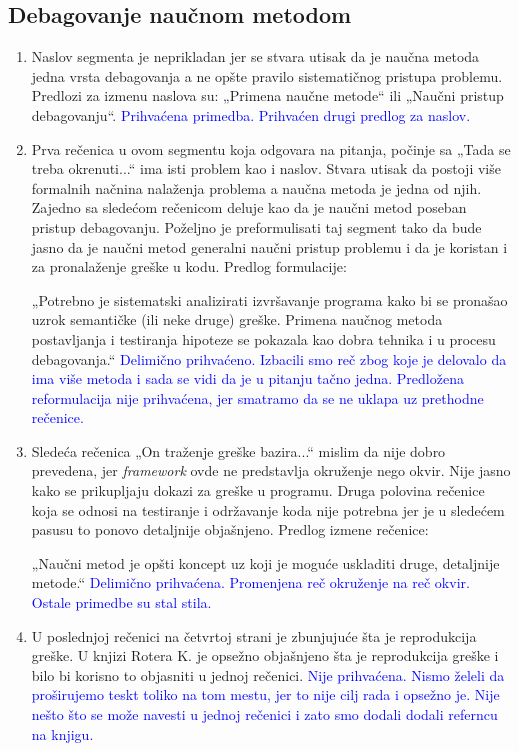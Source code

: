 \documentclass[a4paper]{report}
\newcommand{\odgovor}[1]{\textcolor{blue}{#1}}
\begin{document}
\subsection{Debagovanje naučnom metodom}
\begin{enumerate}
    \item Naslov segmenta je neprikladan jer se stvara utisak da je naučna metoda jedna vrsta debagovanja a ne opšte pravilo sistematičnog pristupa problemu. Predlozi za izmenu naslova su:
    „Primena naučne metode“ ili „Naučni pristup debagovanju“.
    \odgovor{Prihvaćena primedba. Prihvaćen drugi predlog za naslov.}
    \item Prva rečenica u ovom segmentu koja odgovara na pitanja, počinje sa „Tada se treba okrenuti...“ ima isti problem kao i naslov. Stvara utisak da postoji više formalnih načnina nalaženja problema a naučna metoda je jedna od njih. Zajedno sa sledećom rečenicom deluje kao da je naučni metod poseban pristup debagovanju. Poželjno je preformulisati taj segment tako da bude jasno da je naučni metod generalni naučni pristup problemu i da je koristan i za pronalaženje greške u kodu. Predlog formulacije:
    
    „Potrebno je sistematski analizirati izvršavanje programa kako bi se pronašao uzrok semantičke (ili neke druge) greške. Primena naučnog metoda postavljanja i testiranja hipoteze se pokazala kao dobra tehnika i u procesu debagovanja.“
    \odgovor{Delimično prihvaćeno. Izbacili smo reč zbog koje je delovalo da ima više metoda i sada se vidi da je u pitanju tačno jedna. Predložena reformulacija nije prihvaćena, jer smatramo da se ne uklapa uz prethodne rečenice. }
    \item Sledeća rečenica „On traženje greške bazira...“ mislim da nije dobro prevedena, jer \emph{framework} ovde ne predstavlja okruženje nego okvir. Nije jasno kako se prikupljaju dokazi za greške u programu. Druga polovina rečenice koja se odnosi na testiranje i održavanje koda nije potrebna jer je u sledećem pasusu to ponovo detaljnije objašnjeno. Predlog izmene rečenice:
    
    „Naučni metod je opšti koncept uz koji je moguće uskladiti druge, detaljnije metode.“
    \odgovor{Delimično prihvaćena. Promenjena reč okruženje na reč okvir. Ostale primedbe su stal stila.}
    \item U poslednjoj rečenici na četvrtoj strani je zbunjujuće šta je reprodukcija greške. U knjizi Rotera K. je opsežno objašnjeno šta je reprodukcija greške i bilo bi korisno to objasniti u jednoj rečenici.
    \odgovor{Nije prihvaćena. Nismo želeli da proširujemo teskt toliko na tom mestu, jer to nije cilj rada i opsežno je. Nije nešto što se može navesti u jednoj rečenici i zato smo dodali dodali referncu na knjigu.}
\end{enumerate}
\end{document}
